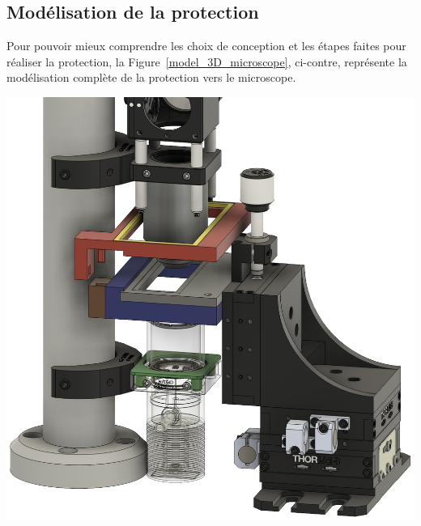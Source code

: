 \subsection{Modélisation de la protection}
\begin{minipage}[c]{0.38\textwidth}
    Pour pouvoir mieux comprendre les choix de conception et les étapes faites pour réaliser la protection, la Figure~\ref{model_3D_microscope}, ci-contre, représente la modélisation complète de la protection vers le microscope.
\end{minipage}\hfill
\begin{minipage}[c]{0.58\textwidth}
    \begin{center}
        \includegraphics[width=\textwidth]{assets/figures/Protections_laser/Securite_mecanique/Protection_vers_microscope/model_3D.jpeg}
    \end{center}
    \label{model_3D_microscope}
\end{minipage}

